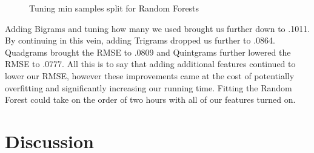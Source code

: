 \documentclass[]{article}
\begin{document}
\begin{flushleft}
\begin{figure}[h]
		\caption{Tuning min samples split for Random Forests}
	\end{figure}
	\newline\newline
	Adding Bigrams and tuning how many we used brought us further down to .1011.  By continuing in this vein, adding Trigrams dropped us further to .0864.  Quadgrams brought the RMSE to .0809 and Quintgrams further lowered the RMSE to .0777.
	\newline\newline
	All this is to say that adding additional features continued to lower our RMSE, however these improvements came at the cost of potentially overfitting and significantly increasing our running time.  Fitting the Random Forest could take on the order of two hours with all of our features turned on.
\end{flushleft}
\section{Discussion}
\end{document}
